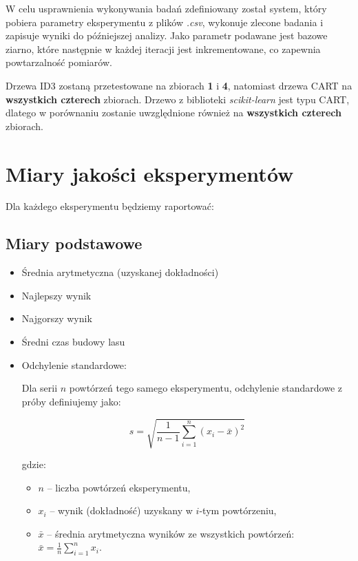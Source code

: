\documentclass[a4paper]{article}
\begin{document}
W celu usprawnienia wykonywania badań zdefiniowany został system, który pobiera parametry eksperymentu z plików \textit{.csv}, wykonuje zlecone badania i zapisuje wyniki do późniejszej analizy.
Jako parametr podawane jest bazowe ziarno, które następnie w każdej iteracji jest inkrementowane, co zapewnia powtarzalność pomiarów.


Drzewa ID3 zostaną przetestowane na zbiorach \textbf{1} i \textbf{4}, natomiast drzewa CART na \textbf{wszystkich czterech} zbiorach. Drzewo z biblioteki \textit{scikit-learn} jest typu CART, dlatego w porównaniu zostanie uwzględnione również na \textbf{wszystkich czterech} zbiorach.


\section{Miary jakości eksperymentów}
\label{sec:miary-jakosci}

Dla każdego eksperymentu będziemy raportować:


\subsection{Miary podstawowe}

\begin{itemize}
    \item Średnia arytmetyczna (uzyskanej dokładności)
    \item Najlepszy wynik
    \item Najgorszy wynik
    \item Średni czas budowy lasu
    \item Odchylenie standardowe:

        Dla serii $n$ powtórzeń tego samego eksperymentu, odchylenie standardowe z próby definiujemy jako:

    \[
    s = \sqrt{\frac{1}{n-1} \sum_{i=1}^{n} (x_i - \bar{x})^2}
    \]

    \noindent gdzie:
    \begin{itemize}
        \item $n$ -- liczba powtórzeń eksperymentu,
        \item $x_i$ -- wynik (dokładność) uzyskany w $i$-tym powtórzeniu,
        \item $\bar{x}$ -- średnia arytmetyczna wyników ze wszystkich powtórzeń: $\bar{x} = \frac{1}{n} \sum_{i=1}^{n} x_i$.
    \end{itemize}
\end{itemize}
\end{document}
